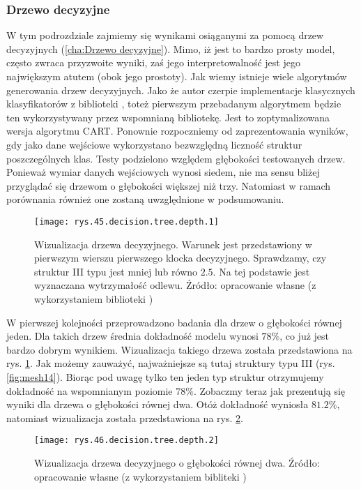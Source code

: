 \subsubsection{Drzewo decyzyjne}
\label{structures.with.dt}

W tym podrozdziale zajmiemy się wynikami osiąganymi za pomocą drzew decyzyjnych (\ref{cha:Drzewo decyzyjne}). Mimo, iż jest to bardzo prosty model, często zwraca przyzwoite wyniki, zaś jego interpretowalność jest jego największym atutem (obok jego prostoty). 
Jak wiemy istnieje wiele algorytmów generowania drzew decyzyjnych. Jako że autor czerpie implementacje klasycznych klasyfikatorów z biblioteki , toteż pierwszym przebadanym algorytmem będzie ten wykorzystywany przez wspomnianą bibliotekę. Jest to zoptymalizowana wersja algorytmu CART.
Ponownie rozpoczniemy od zaprezentowania wyników, gdy jako dane wejściowe wykorzystano bezwzględną liczność struktur poszczególnych klas. Testy podzielono względem głębokości testowanych drzew. Ponieważ wymiar danych wejściowych wynosi siedem, nie ma sensu bliżej przyglądać się drzewom o głębokości większej niż trzy. Natomiast w ramach porównania również one zostaną uwzględnione w podsumowaniu. 
\begin{figure}[h]
    \centering
    \texttt{[image: rys.45.decision.tree.depth.1]}
    \caption{Wizualizacja drzewa decyzyjnego. Warunek jest przedstawiony w pierwszym wierszu pierwszego klocka decyzyjnego. Sprawdzamy, czy struktur III typu jest mniej lub równo $2.5$. Na tej podstawie jest wyznaczana wytrzymałość odlewu. Źródło: opracowanie własne (z wykorzystaniem biblioteki )}
    \label{rys.45.decision.tree.depth.1}
\end{figure}
W pierwszej kolejności przeprowadzono badania dla drzew o głębokości równej jeden. Dla takich drzew średnia dokładność modelu wynosi $78\%$, co już jest bardzo dobrym wynikiem. Wizualizacja takiego drzewa została przedstawiona na rys. \ref{rys.45.decision.tree.depth.1}. 
Jak możemy zauważyć, najważniejsze są tutaj struktury typu III (rys. \ref{fig:mesh14}). Biorąc pod uwagę tylko ten jeden typ struktur otrzymujemy dokładność na wspomnianym poziomie $78\%$. Zobaczmy teraz jak prezentują się wyniki dla drzewa o głębokości równej dwa. Otóż dokładność wyniosła $81.2\%$, natomiast wizualizacja została przedstawiona na rys. \ref{rys.46.decision.tree.depth.2}. 
\begin{figure}[h]
    \centering
    \texttt{[image: rys.46.decision.tree.depth.2]}
    \caption{Wizualizacja drzewa decyzyjnego o głębokości równej dwa. Źródło: opracowanie własne (z wykorzystaniem bibliteki )}
    \label{rys.46.decision.tree.depth.2}
\end{figure}
